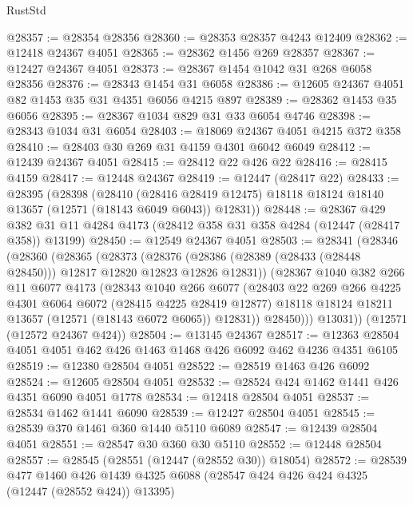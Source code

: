 \begin{lexlean}{RustStd}
\begin{coremodule}
@28357 := @28354 @28356
@28360 := @28353 @28357 @4243 @12409
@28362 := @12418 @24367 @4051
@28365 := @28362 @1456 @269 @28357
@28367 := @12427 @24367 @4051
@28373 := @28367 @1454 @1042 @31 @268 @6058 @28356
@28376 := @28343 @1454 @31 @6058
@28386 := @12605 @24367 @4051 @82 @1453 @35 @31 @4351 @6056 @4215 @897
@28389 := @28362 @1453 @35 @6056
@28395 := @28367 @1034 @829 @31 @33 @6054 @4746
@28398 := @28343 @1034 @31 @6054
@28403 := @18069 @24367 @4051 @4215 @372 @358
@28410 := @28403 @30 @269 @31 @4159 @4301 @6042 @6049
@28412 := @12439 @24367 @4051
@28415 := @28412 @22 @426 @22
@28416 := @28415 @4159
@28417 := @12448 @24367
@28419 := @12447 (@28417 @22)
@28433 := @28395
    (@28398
      (@28410
        (@28416 @28419 @12475)
        @18118
        @18124
        @18140
        @13657
        (@12571 (@18143 @6049 @6043))
        @12831))
@28448 := @28367
    @429
    @382
    @31
    @11
    @4284
    @4173
    (@28412 @358 @31 @358 @4284 (@12447 (@28417 @358)) @13199)
@28450 := @12549 @24367 @4051
@28503 := @28341
    (@28346
      (@28360
        (@28365
          (@28373
            (@28376 (@28386 (@28389 (@28433 (@28448 @28450))) @12817 @12820 @12823 @12826 @12831))
            (@28367
              @1040
              @382
              @266
              @11
              @6077
              @4173
              (@28343
                @1040
                @266
                @6077
                (@28403
                  @22
                  @269
                  @266
                  @4225
                  @4301
                  @6064
                  @6072
                  (@28415 @4225 @28419 @12877)
                  @18118
                  @18124
                  @18211
                  @13657
                  (@12571 (@18143 @6072 @6065))
                  @12831))
              @28450)))
        @13031))
    (@12571 (@12572 @24367 @424))
@28504 := @13145 @24367
@28517 := @12363 @28504 @4051 @4051 @462 @426 @1463 @1468 @426 @6092 @462 @4236 @4351 @6105
@28519 := @12380 @28504 @4051
@28522 := @28519 @1463 @426 @6092
@28524 := @12605 @28504 @4051
@28532 := @28524 @424 @1462 @1441 @426 @4351 @6090 @4051 @1778
@28534 := @12418 @28504 @4051
@28537 := @28534 @1462 @1441 @6090
@28539 := @12427 @28504 @4051
@28545 := @28539 @370 @1461 @360 @1440 @5110 @6089
@28547 := @12439 @28504 @4051
@28551 := @28547 @30 @360 @30 @5110
@28552 := @12448 @28504
@28557 := @28545 (@28551 (@12447 (@28552 @30)) @18054)
@28572 := @28539
    @477
    @1460
    @426
    @1439
    @4325
    @6088
    (@28547 @424 @426 @424 @4325 (@12447 (@28552 @424)) @13395)

\end{coremodule}
\end{lexlean}
